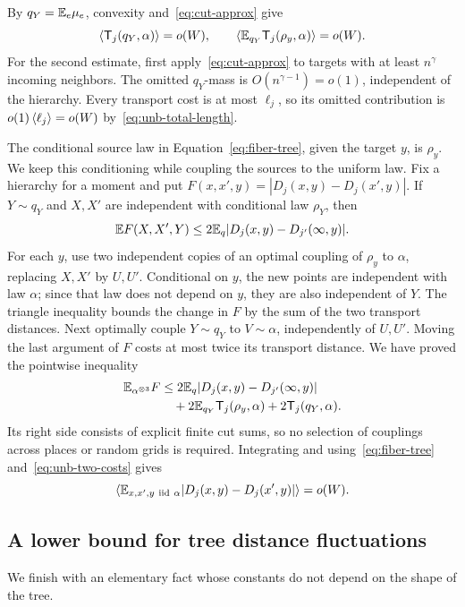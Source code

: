 By $q_Y=\mathbb E_e\mu_e$, convexity and~\eqref{eq:cut-approx} give
\begin{equation}\label{eq:unb-two-costs}
 \left\langle \mathsf T_j(q_Y,\alpha)\right\rangle=o(W),\qquad
 \left\langle \mathbb E_{q_Y}\mathsf T_j(\rho_y,\alpha)\right\rangle=o(W).
\end{equation}
For the second estimate, first apply~\eqref{eq:cut-approx} to targets
with at least $n^\gamma$ incoming neighbors. The omitted $q_Y$-mass
is $O(n^{\gamma-1})=o(1)$, independent of the hierarchy. Every
transport cost is at most $\ell_j$, so its omitted contribution is
$o(1)\left\langle \ell_j\right\rangle=o(W)$ by~\eqref{eq:unb-total-length}.

The conditional source law in Equation~\eqref{eq:fiber-tree}, given
the target $y$, is $\rho_y$. We keep this conditioning while coupling
the sources to the uniform law.
Fix a hierarchy for a moment and put
$F(x,x',y)=|D_j(x,y)-D_j(x',y)|$. If $Y\sim q_Y$ and $X,X'$ are
independent with conditional law $\rho_Y$, then
\[
 \mathbb E F(X,X',Y)
 \le2\mathbb E_q|D_j(x,y)-D_{j'}(\infty,y)|.
\]
For each $y$, use two independent copies of an optimal coupling of $\rho_y$
to $\alpha$, replacing $X,X'$ by $U,U'$. Conditional on $y$, the
new points are independent with law $\alpha$; since that law does
not depend on $y$, they are also independent of $Y$. The triangle
inequality bounds the change in $F$ by the sum of the two transport
distances. Next optimally couple $Y\sim q_Y$ to $V\sim\alpha$, independently
of $U,U'$. Moving the last argument of $F$ costs at most twice its
transport distance. We have proved the pointwise inequality
\begin{align*}
 \mathbb E_{\alpha^{\otimes3}}F
 &\le 2\mathbb E_q|D_j(x,y)-D_{j'}(\infty,y)|\\
 &\quad+2\mathbb E_{q_Y}\mathsf T_j(\rho_y,\alpha)
       +2\mathsf T_j(q_Y,\alpha).
\end{align*}
Its right side consists of explicit finite cut sums, so no selection
of couplings across places or random grids is required. Integrating
and using~\eqref{eq:fiber-tree} and~\eqref{eq:unb-two-costs} gives
\begin{equation}\label{eq:iid-tree}
 \left\langle \mathbb E_{x,x',y\ \mathrm{iid}\ \alpha}
 |D_j(x,y)-D_j(x',y)|\right\rangle=o(W).
\end{equation}

\subsection{A lower bound for tree distance fluctuations}

We finish with an elementary fact whose constants do not depend on
the shape of the tree.

